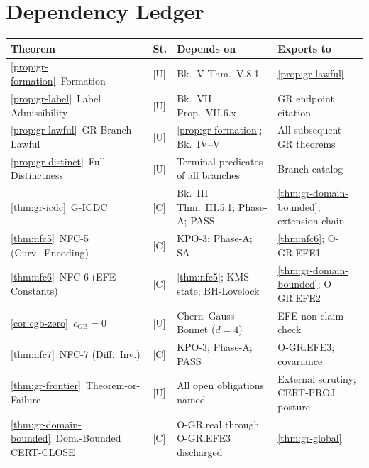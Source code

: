 \documentclass[12pt,oneside]{amsbook}
\theoremstyle{plain}
\theoremstyle{definition}
\theoremstyle{remark}
\begin{document}
\section{Dependency Ledger}

\renewcommand{\arraystretch}{1.4}
\noindent
\begin{tabular}{@{}p{4.0cm}p{0.8cm}p{3.6cm}p{4.2cm}@{}}
\hline
\textbf{Theorem} & \textbf{St.} & \textbf{Depends on} & \textbf{Exports to} \\
\hline
\ref{prop:gr-formation}\ Formation
 & [U] & Bk.~V Thm.~V.8.1
 & \ref{prop:gr-lawful} \\

\ref{prop:gr-label}\ Label Admissibility
 & [U] & Bk.~VII Prop.~VII.6.x
 & GR endpoint citation \\

\ref{prop:gr-lawful}\ GR Branch Lawful
 & [U] & \ref{prop:gr-formation}; Bk.~IV--V
 & All subsequent GR theorems \\

\ref{prop:gr-distinct}\ Full Distinctness
 & [U] & Terminal predicates of all branches
 & Branch catalog \\

\ref{thm:gr-icdc}\ G-ICDC
 & [C] & Bk.~III Thm.~III.5.1; Phase-A; PASS
 & \ref{thm:gr-domain-bounded}; extension chain \\

\ref{thm:nfc5}\ NFC-5 (Curv.\ Encoding)
 & [C] & KPO-3; Phase-A; SA
 & \ref{thm:nfc6}; O-GR.EFE1 \\

\ref{thm:nfc6}\ NFC-6 (EFE Constants)
 & [C] & \ref{thm:nfc5}; KMS state; BH-Lovelock
 & \ref{thm:gr-domain-bounded}; O-GR.EFE2 \\

\ref{cor:cgb-zero}\ $c_{\mathrm{GB}}=0$
 & [U] & Chern--Gauss--Bonnet ($d=4$)
 & EFE non-claim check \\

\ref{thm:nfc7}\ NFC-7 (Diff.\ Inv.)
 & [C] & KPO-3; Phase-A; PASS
 & O-GR.EFE3; covariance \\

\ref{thm:gr-frontier}\ Theorem-or-Failure
 & [U] & All open obligations named
 & External scrutiny; CERT-PROJ posture \\

\ref{thm:gr-domain-bounded}\ Dom.-Bounded CERT-CLOSE
 & [C] & O-GR.real through O-GR.EFE3 discharged
 & \ref{thm:gr-global} \\


\end{tabular}
\end{document}
